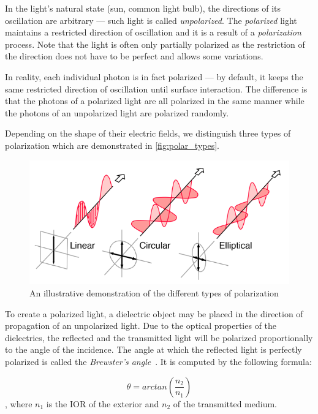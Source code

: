 In the light's natural state (sun, common light bulb), the directions of its oscillation are arbitrary --- such light is called \emph{unpolarized}. The \emph{polarized} light maintains a restricted direction of oscillation and it is a result of a \emph{polarization} process. Note that the light is often only partially polarized as the restriction of the direction does not have to be perfect and allows some variations.

In reality, each individual photon is in fact polarized --- by default, it keeps the same restricted direction of oscillation until surface interaction. The difference is that the photons of a polarized light are all polarized in the same manner while the photons of an unpolarized light are polarized randomly. 

Depending on the shape of their electric fields, we distinguish three types of polarization which are demonstrated in \autoref{fig:polar_types}.

\begin{figure}[h]
	\centering
	\includegraphics[width=.7\linewidth]{img/polar_types.png}
	\caption[polar types]{An illustrative demonstration of the different types of polarization \footnotemark}
	\label{fig:polar_types}
\end{figure}

To create a polarized light, a dielectric object may be placed in the direction of propagation of an unpolarized light. Due to the optical properties of the dielectrics, the reflected and the transmitted light will be polarized proportionally to the angle of the incidence. The angle at which the reflected light is perfectly polarized is called the \emph{Brewster's angle}~\cite{brewster1815laws}. It is computed by the following formula:

\begin{equation}
\theta=arctan(\frac{n_2}{n_1})
\end{equation}
, where $n_1$ is the IOR of the exterior and $n_2$ of the transmitted medium.

